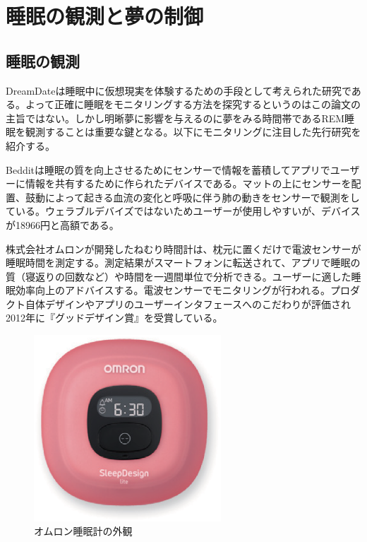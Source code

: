 \section{睡眠の観測と夢の制御}
\subsection{睡眠の観測}
DreamDateは睡眠中に仮想現実を体験するための手段として考えられた研究である。よって正確に睡眠をモニタリングする方法を探究するというのはこの論文の主旨ではない。しかし明晰夢に影響を与えるのに夢をみる時間帯であるREM睡眠を観測することは重要な鍵となる。以下にモニタリングに注目した先行研究を紹介する。

Bedditは睡眠の質を向上させるためにセンサーで情報を蓄積してアプリでユーザーに情報を共有するために作られたデバイスである。マットの上にセンサーを配置、鼓動によって起きる血流の変化と呼吸に伴う肺の動きをセンサーで観測をしている。ウェラブルデバイズではないためユーザーが使用しやすいが、デバイスが18966円と高額である。

株式会社オムロンが開発したねむり時間計は、枕元に置くだけで電波センサーが睡眠時間を測定する。測定結果がスマートフォンに転送されて、アプリで睡眠の質（寝返りの回数など）や時間を一週間単位で分析できる。ユーザーに適した睡眠効率向上のアドバイスする。電波センサーでモニタリングが行われる\cite{omron}。プロダクト自体デザインやアプリのユーザーインタフェースへのこだわりが評価され2012年に『グッドデザイン賞』を受賞している。

\begin{figure}[htbp]
\begin{center}
\includegraphics[width=7cm]{eps/omuron.eps}
\caption{オムロン睡眠計の外観}
\label{omuron}
\end{center}
\end{figure}

